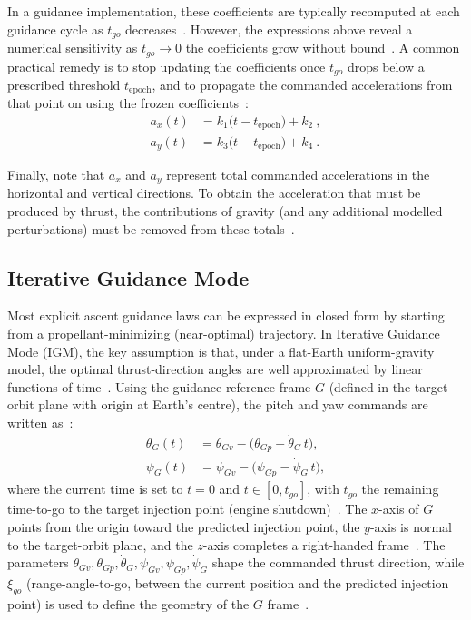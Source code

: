 In a guidance implementation, these coefficients are typically recomputed at each guidance cycle as
$t_{go}$ decreases~\cite{Mooij_lunar_ascent}. However, the expressions above reveal a numerical sensitivity as $t_{go}\to 0$ the
coefficients grow without bound~\cite{Mooij_lunar_ascent}. A common practical remedy is to stop updating the coefficients once
$t_{go}$ drops below a prescribed threshold $t_{\mathrm{epoch}}$, and to propagate the commanded
accelerations from that point on using the frozen coefficients~\cite{wong2006hazard_avoidance_mars, sostaric2005powered}:
\begin{equation}
\begin{aligned}
a_x(t) &= k_1\bigl(t-t_{\mathrm{epoch}}\bigr)+k_2 \ ,\\
a_y(t) &= k_3\bigl(t-t_{\mathrm{epoch}}\bigr)+k_4 \ .
\end{aligned}
\end{equation}

Finally, note that $a_x$ and $a_y$ represent total commanded accelerations in the horizontal and
vertical directions. To obtain the acceleration that must be produced by thrust, the contributions of
gravity (and any additional modelled perturbations) must be removed from these totals~\cite{Mooij_lunar_ascent}.

\subsection{Iterative Guidance Mode}

Most explicit ascent guidance laws can be expressed in closed form by starting from a propellant-minimizing (near-optimal) trajectory. In Iterative Guidance Mode (IGM), the key assumption is that, under a flat-Earth uniform-gravity model, the optimal thrust-direction angles are well approximated by linear functions of time~\cite{ChandlerSmith1967IterativeGuidanceMode}. Using the guidance reference frame $G$ (defined in the target-orbit plane with origin at Earth’s centre), the pitch and yaw commands are written as~\cite{SONG2015463}:
\begin{align}
\theta_G(t) &= \theta_{Gv} - \bigl(\theta_{Gp} - \dot{\theta}_G\,t\bigr),
\label{eq:igm_theta}\\
\psi_G(t)   &= \psi_{Gv} - \bigl(\psi_{Gp} - \dot{\psi}_G\,t\bigr),
\label{eq:igm_psi}
\end{align}
where the current time is set to $t=0$ and $t\in[0,t_{go}]$, with $t_{go}$ the remaining time-to-go to the target injection point (engine shutdown)~\cite{SONG2015463}.
The $x$-axis of $G$ points from the origin toward the predicted injection point, the $y$-axis is normal to the target-orbit plane, and the $z$-axis completes a right-handed frame~\cite{SONG2015463}. The parameters
$\theta_{Gv},\theta_{Gp},\dot{\theta}_G,\psi_{Gv},\psi_{Gp},\dot{\psi}_G$
shape the commanded thrust direction, while $\xi_{go}$ (range-angle-to-go, between the current position and the predicted injection point) is used to define the geometry of the $G$ frame~\cite{SONG2015463}.

